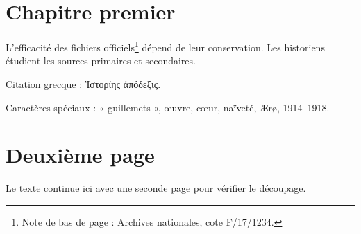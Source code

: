 \documentclass[11pt]{article}
\begin{document}
\section*{Chapitre premier}
L'efficacité des fichiers officiels\footnote{Note de bas de page : Archives nationales, cote F/17/1234.} dépend de leur conservation.
Les historiens étudient les sources primaires et secondaires.

Citation grecque : \foreignlanguage{greek}{Ἱστορίης ἀπόδεξις}.

Caractères spéciaux : « guillemets », œuvre, cœur, naïveté, Ærø, 1914–1918.
\newpage
\section*{Deuxième page}
Le texte continue ici avec une seconde page pour vérifier le découpage.
\end{document}
